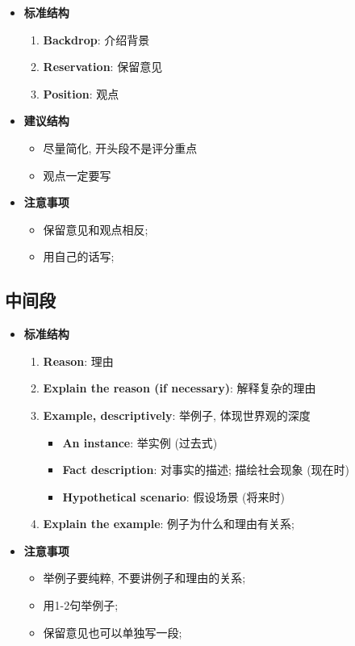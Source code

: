     \begin{itemize}
      \item \textbf{标准结构}
      \begin{enumerate}
        \item \textbf{Backdrop}: 介绍背景
        \item \textbf{Reservation}: 保留意见
        \item \textbf{Position}: 观点
      \end{enumerate}

      \item \textbf{建议结构}
      \begin{itemize}
        \item 尽量简化, 开头段不是评分重点
        \item 观点一定要写
      \end{itemize}

      \item \textbf{注意事项}
      \begin{itemize}
        \item 保留意见和观点相反;
        \item 用自己的话写;
      \end{itemize}
    \end{itemize}

  \subsection{中间段}

    \begin{itemize}
      \item \textbf{标准结构}
      \begin{enumerate}
        \item \textbf{Reason}: 理由
        \item \textbf{Explain the reason (if necessary)}: 解释复杂的理由
        \item \textbf{Example, descriptively}: 举例子, 体现世界观的深度
        \begin{itemize}
          \item \textbf{An instance}: 举实例 (过去式)
          \item \textbf{Fact description}: 对事实的描述; 描绘社会现象 (现在时)
          \item \textbf{Hypothetical scenario}: 假设场景 (将来时)
        \end{itemize}

        \item \textbf{Explain the example}: 例子为什么和理由有关系;
      \end{enumerate}

      \item \textbf{注意事项}
      \begin{itemize}
        \item 举例子要纯粹, 不要讲例子和理由的关系;
        \item 用1-2句举例子;
        \item 保留意见也可以单独写一段;
      \end{itemize}
    \end{itemize}

